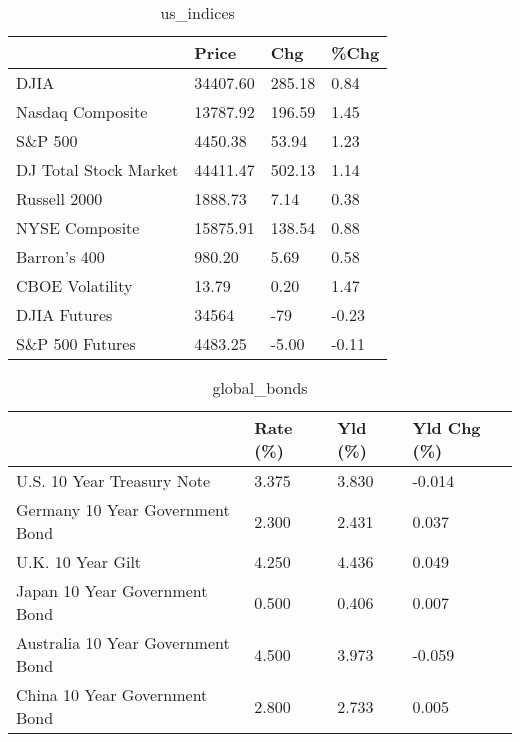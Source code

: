 \documentclass{article}%
\begin{document}
%


\begin{table}[htbp]%
\caption{us\_indices}%
\centering%
\begin{adjustbox}{width=1\textwidth}%
\begin{tabular}{llll}
\toprule
                      &    Price &    Chg &  \%Chg \\
\midrule
                 DJIA & 34407.60 & 285.18 &  0.84 \\
     Nasdaq Composite & 13787.92 & 196.59 &  1.45 \\
              S\&P 500 &  4450.38 &  53.94 &  1.23 \\
DJ Total Stock Market & 44411.47 & 502.13 &  1.14 \\
         Russell 2000 &  1888.73 &   7.14 &  0.38 \\
       NYSE Composite & 15875.91 & 138.54 &  0.88 \\
         Barron's 400 &   980.20 &   5.69 &  0.58 \\
      CBOE Volatility &    13.79 &   0.20 &  1.47 \\
         DJIA Futures &    34564 &    -79 & -0.23 \\
      S\&P 500 Futures &  4483.25 &  -5.00 & -0.11 \\
\bottomrule
\end{tabular}
%
\end{adjustbox}%
\end{table}

%


\begin{table}[htbp]%
\caption{global\_bonds}%
\centering%
\begin{adjustbox}{width=1\textwidth}%
\begin{tabular}{llll}
\toprule
                                  & Rate (\%) & Yld (\%) & Yld Chg (\%) \\
\midrule
       U.S. 10 Year Treasury Note &    3.375 &   3.830 &      -0.014 \\
  Germany 10 Year Government Bond &    2.300 &   2.431 &       0.037 \\
                U.K. 10 Year Gilt &    4.250 &   4.436 &       0.049 \\
    Japan 10 Year Government Bond &    0.500 &   0.406 &       0.007 \\
Australia 10 Year Government Bond &    4.500 &   3.973 &      -0.059 \\
    China 10 Year Government Bond &    2.800 &   2.733 &       0.005 \\
\bottomrule
\end{tabular}
%
\end{adjustbox}%
\end{table}
\end{document}
